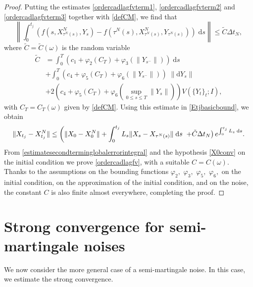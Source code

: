 \documentclass[reqno,12pt]{amsart}
\theoremstyle{plain} %
\theoremstyle{definition} %
\begin{document}
\begin{proof}
    Putting the estimates \eqref{ordercadlagfvterm1}, \eqref{ordercadlagfvterm2} and \eqref{ordercadlagfvterm3} together with \eqref{defCM}, we find that
    \[
        \left\|\int_0^{t_j} \left( f(s, X_{\tau^N(s)}^N, Y_s) - f(\tau^N(s), X_{\tau^N(s)}^N, Y_{\tau^N(s)}) \right)\;\mathrm{d}s\right\| \leq \tilde C \Delta t_N,
    \]
    where $\tilde C=\tilde C(\omega)$ is the random variable
    \begin{equation}
        \begin{aligned}
            \tilde C & = \int_0^T \left(c_1 + \varphi_2(C_T) + \varphi_3(\|Y_{s^-}\|)\right)\;\mathrm{d}s \\
            & + \int_0^T \left(c_4 + \varphi_5(C_T) + \varphi_6(\|Y_{s^-}\|)\right)\;\|\mathrm{d}Y_s\| \\
            & + 2\left(c_4 + \varphi_5(C_T) + \varphi_6\left(\sup_{0\leq s \leq T}\|Y_s\|\right)\right) V(\{Y_t\}_t; I),
        \end{aligned}
    \end{equation}
    with $C_T=C_T(\omega)$ given by \eqref{defCM}. Using this estimate in \eqref{Etjbasicbound}, we obtain
    \[
        \|X_{t_j} - X_{t_j}^N\| \leq \left( \|X_0 - X_0^N\| + \int_0^{t_j} L_s\|X_s - X_{\tau^N(s)}\| \;\mathrm{d}s \right. \\
            \left. + \tilde C \Delta t_N\right) e^{\int_0^{t_j} L_s\;\mathrm{d}s}.
    \]
    From \eqref{estimatesecondterminglobalerrorintegral} and the hypothesis \eqref{X0conv} on the initial condition we prove \eqref{ordercadlagfv}, with a suitable $C=C(\omega)$. Thanks to the assumptions on the bounding functions $\varphi_2,$ $\varphi_3,$ $\varphi_5,$ $\varphi_6,$ on the initial condition, on the approximation of the initial condition, and on the noise, the constant $C$ is also finite almost everywhere, completing the proof.
\end{proof}

\section{Strong convergence for semi-martingale noises}
\label{secsubmartingale}

We now consider the more general case of a semi-martingale noise. In this case, we estimate the strong convergence.
\end{document}
